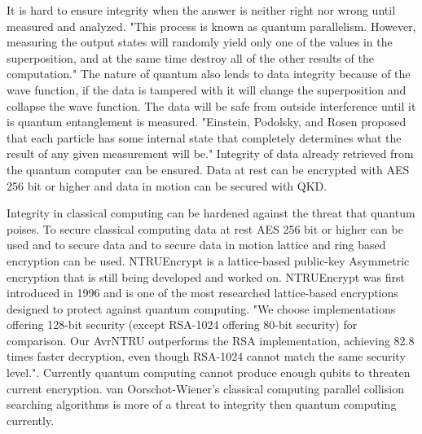 \documentclass[sigconf]{acmart}
\begin{document}
It is hard to ensure integrity when the answer is neither right nor wrong until measured and analyzed. "This process is known as quantum parallelism. However, measuring the output states will randomly yield only one of the values in the superposition, and at the same time destroy all of the other results of the computation."\cite{rieffel_introduction_1998} The nature of quantum also lends to data integrity because of the wave function, if the data is tampered with it will change the superposition and collapse the wave function. The data will be safe from outside interference until it is quantum entanglement is measured. "Einstein, Podolsky, and Rosen proposed that each particle has some internal state that completely determines what the result of any given measurement will be."\cite{rieffel_introduction_1998} Integrity of data already retrieved from the quantum computer can be ensured. Data at rest can be encrypted with AES 256 bit or higher and data in motion can be secured with QKD. 

Integrity in classical computing can be hardened against the threat that quantum poises. To secure classical computing data at rest AES 256 bit or higher can be used and to secure data and to secure data in motion lattice and ring based encryption can be used. NTRUEncrypt is a lattice-based public-key Asymmetric encryption that is still being developed and worked on. NTRUEncrypt was first introduced in 1996 and is one of the most researched lattice-based encryptions designed to protect against quantum computing. %
"We choose implementations offering 128-bit security (except RSA-1024 offering 80-bit security) for comparison. Our AvrNTRU outperforms the RSA implementation, achieving 82.8 times faster decryption, even though RSA-1024 cannot match the same security level."\cite{cheng_h._lightweight_2021}. Currently quantum computing cannot produce enough qubits to threaten current encryption. van Oorschot-Wiener’s classical computing parallel collision searching algorithms is more of a threat to integrity then quantum computing currently\cite{oorschot_todo}.
\end{document}
